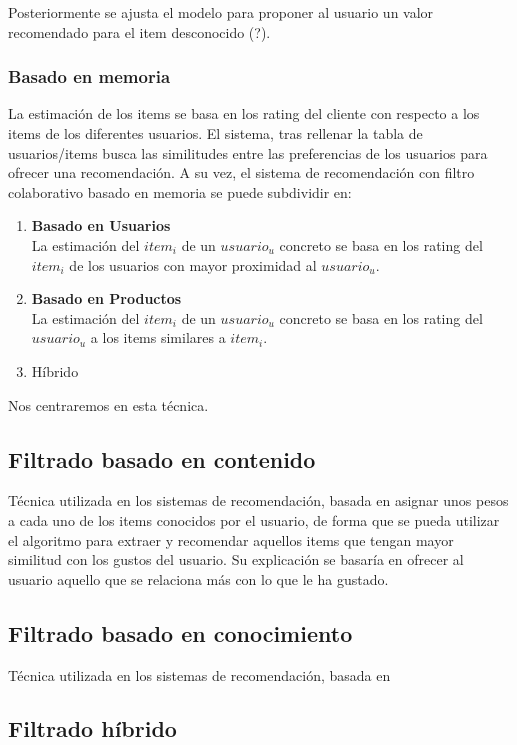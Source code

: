 Posteriormente se ajusta el modelo para proponer al usuario un valor recomendado para el item desconocido (?).
\subsubsection{Basado en memoria}
La estimación de los items se basa en los rating del cliente con respecto a los items de los diferentes usuarios. El sistema, tras rellenar la tabla de usuarios/items busca las similitudes entre las preferencias de los usuarios para ofrecer una recomendación. 
A su vez, el sistema de recomendación con filtro colaborativo basado en memoria se puede subdividir en: 
\begin{enumerate}

\item  \textbf{Basado en Usuarios}\\ La estimación del  $item_{i}$ de un $usuario_{u}$ concreto se basa en los rating del $item_{i}$  de los usuarios  con mayor proximidad al $usuario_{u}$.

\item \textbf{Basado en Productos}\\La estimación del  $item_{i}$ de un $usuario_{u}$ concreto se basa en los rating del $usuario_{u}$ a los items similares a $item_{i}$.

\item Híbrido
\end{enumerate}

Nos centraremos en esta técnica.
\subsection{Filtrado basado en contenido}
Técnica utilizada en los sistemas de recomendación,  basada en asignar unos pesos a cada uno de los items conocidos por el usuario, de forma que se pueda utilizar el algoritmo para extraer y recomendar aquellos items que tengan mayor similitud con los gustos del usuario.
Su explicación se basaría en ofrecer al usuario aquello que se relaciona más con lo que le ha gustado. 

\subsection{Filtrado basado en conocimiento}
Técnica utilizada en los sistemas de recomendación, basada en 
\subsection{Filtrado híbrido}

